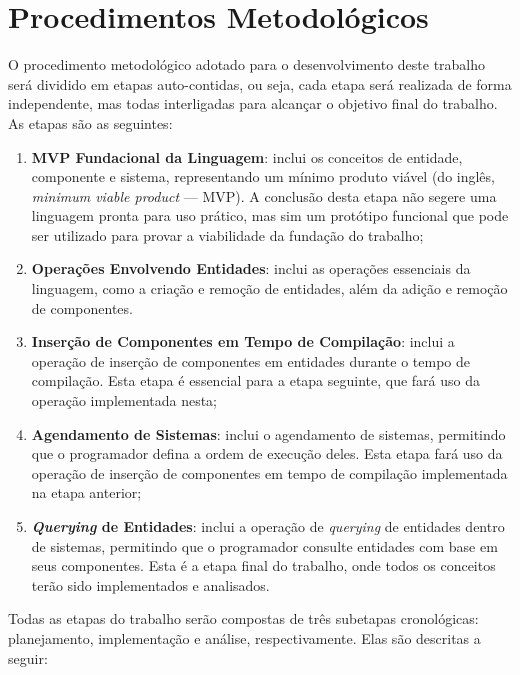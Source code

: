 \section{Procedimentos Metodológicos}

O procedimento metodológico adotado para o desenvolvimento deste trabalho será dividido em etapas auto-contidas, ou seja, cada etapa será realizada de forma independente, mas todas interligadas para alcançar o objetivo final do trabalho. As etapas são as seguintes:

\begin{enumerate}
    \item \textbf{MVP Fundacional da Linguagem}: inclui os conceitos de entidade, componente e sistema, representando um mínimo produto viável (do inglês, \textit{minimum viable product} — MVP). A conclusão desta etapa não segere uma linguagem pronta para uso prático, mas sim um protótipo funcional que pode ser utilizado para provar a viabilidade da fundação do trabalho;
    \item \textbf{Operações Envolvendo Entidades}: inclui as operações essenciais da linguagem, como a criação e remoção de entidades, além da adição e remoção de componentes.
    \item \textbf{Inserção de Componentes em Tempo de Compilação}: inclui a operação de inserção de componentes em entidades durante o tempo de compilação. Esta etapa é essencial para a etapa seguinte, que fará uso da operação implementada nesta;
    \item \textbf{Agendamento de Sistemas}: inclui o agendamento de sistemas, permitindo que o programador defina a ordem de execução deles. Esta etapa fará uso da operação de inserção de componentes em tempo de compilação implementada na etapa anterior;
    \item \textbf{\textit{Querying} de Entidades}: inclui a operação de \textit{querying} de entidades dentro de sistemas, permitindo que o programador consulte entidades com base em seus componentes. Esta é a etapa final do trabalho, onde todos os conceitos terão sido implementados e analisados.
\end{enumerate}

Todas as etapas do trabalho serão compostas de três subetapas cronológicas: planejamento, implementação e análise, respectivamente. Elas são descritas a seguir:


